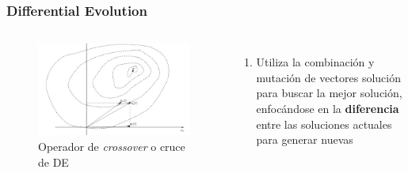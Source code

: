 \begin{frame}
  \frametitle{Differential Evolution}
  \begin{columns}
    \begin{figure}
      \begin{center}
        \includegraphics[width=1\textwidth]{imagenes/chapter3/de-crossover.png}
      \end{center}
      \caption{Operador de \textit{crossover} o cruce de DE \footnotemark[11]}
    \end{figure}
    \begin{enumerate}
      \item Utiliza la combinación y mutación de vectores solución para buscar la mejor solución, enfocándose en la \textbf{diferencia} entre las soluciones actuales para generar nuevas
    \end{enumerate}
  \end{columns}
\end{frame}